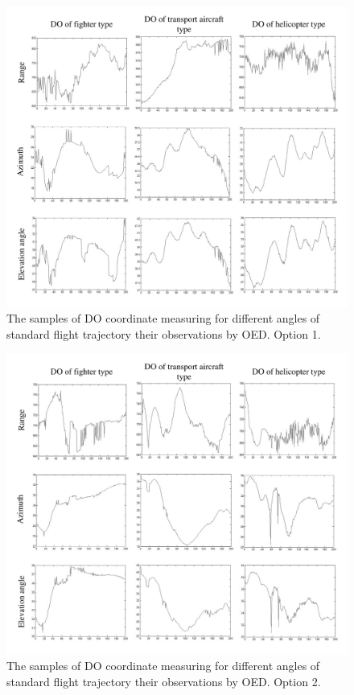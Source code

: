 \begin{figure}[h]
\setcaptionmargin{5mm}
\onelinecaptionstrue
\includegraphics[width=1.0\textwidth]{pics/fig_1_option_1.pdf}
\caption{The samples of DO coordinate measuring for different angles of standard flight trajectory their observations by OED. Option 1.}\label{fig:fig_1_option_1}
\end{figure}

\begin{figure}[h]
\setcaptionmargin{5mm}
\onelinecaptionstrue
\includegraphics[width=1.0\textwidth]{pics/fig_1_option_2.pdf}
\caption{The samples of DO coordinate measuring for different angles of standard flight trajectory their observations by OED. Option 2.}\label{fig:fig_1_option_2}
\end{figure}

